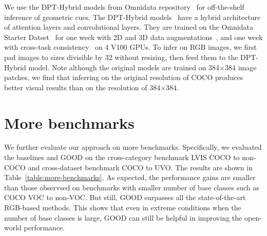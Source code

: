 \documentclass{article} \usepackage{iclr2023_conference,times}
\begin{document}
We use the DPT-Hybrid models from Omnidata repository~\citep{eftekhar2021omnidata} for off-the-shelf inference of geometric cues. The DPT-Hybrid models~\citep{Ranftl2021} have a hybrid architecture of attention layers and convolutional layers. They are trained on the Omnidata Starter Datset~\citep{eftekhar2021omnidata} for one week with 2D and 3D data augmentations~\citep{kar20223d}, and one week with cross-task consistency~\citep{zamir2020robust} on 4 V100 GPUs. To infer on RGB images, we first pad images to sizes divisible by 32 without resizing, then feed them to the DPT-Hybrid model. Note although the original models are trained on 384$\times$384 image patches, we find that inferring on the original resolution of COCO produces better visual results than on the resolution of 384$\times$384.


\section{More benchmarks}
We further evaluate our approach on more benchmarks. Specifically, we evaluated the baselines and GOOD on the cross-category benchmark LVIS COCO to non-COCO and cross-dataset benchmark COCO to UVO. The results are shown in Table~\ref{table:more-benchmarks}. As expected, the performance gains are smaller than those observsed on benchmarks with smaller number of base classes such as COCO VOC to non-VOC. But still, GOOD surpasses all the state-of-the-art RGB-based methods. This shows that even in extreme conditions when the number of base classes is large, GOOD can still be helpful in improving the open-world performance.
\end{document}
